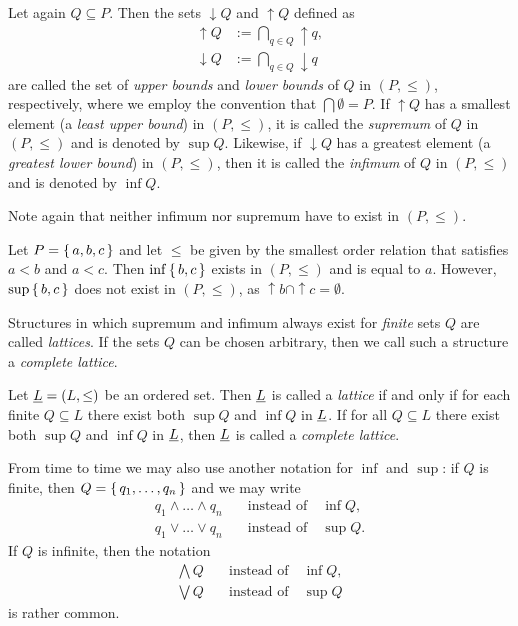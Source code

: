 Let again $Q \subseteq P$.  Then the sets ${\downarrow} Q$ and ${\uparrow} Q$ defined as
\begin{align*}
  {\uparrow} Q &:= \bigcap_{q \in Q} {\uparrow} q,\\
  {\downarrow} Q &:= \bigcap_{q \in Q} {\downarrow} q
\end{align*}
are called the set of \emph{upper bounds} and \emph{lower bounds} of $Q$ in $(P, \le)$,
respectively, where we employ the convention that $\bigcap \emptyset = P$.  If ${\uparrow}
Q$ has a smallest element (a \emph{least upper bound}) in $(P, \le)$, it is called the
\emph{supremum} of $Q$ in $(P, \le)$ and is denoted by $\sup Q$.  Likewise, if
${\downarrow} Q$ has a greatest element (a \emph{greatest lower bound}) in $(P, \le)$,
then it is called the \emph{infimum} of $Q$ in $(P, \le)$ and is denoted by $\inf Q$.

Note again that neither infimum nor supremum have to exist in $(P, \le)$.

\begin{Example}
  \label{expl:3}
  Let $P = {\{\, a, b, c \,\}}$ and let $\le$ be given by the smallest order relation that
  satisfies $a < b$ and $a < c$.  Then $\inf{\ensuremath{\{\,b,c\,\}}}$ exists in $(P, \le)$ and is equal
  to $a$.  However, $\sup{\ensuremath{\{\,b, c\,\}}}$ does not exist in $(P, \le)$, as ${\uparrow} b \cap
  {\uparrow} c = \emptyset$.
\end{Example}

\noindent%
Structures in which supremum and infimum always exist for \emph{finite} sets $Q$ are
called \emph{lattices}.  If the sets $Q$ can be chosen arbitrary, then we call such a
structure a \emph{complete lattice}.

\begin{Definition}[Lattice]
  \label{def:lattice}
  Let ${\underline{L}} = (L, \le)$ be an ordered set.  Then ${\underline{L}}$ is called a \emph{lattice} if
  and only if for each finite $Q \subseteq L$ there exist both $\sup Q$ and $\inf Q$ in
  ${\underline{L}}$.  If for all $Q \subseteq L$ there exist both $\sup Q$ and $\inf Q$ in ${\underline{L}}$, then ${\underline{L}}$ is called a \emph{complete lattice}.
\end{Definition}

\noindent%
From time to time we may also use another notation for $\inf$ and $\sup$: if $Q$ is
finite, then $Q = {\{\, q_1, \dots, q_n \,\}}$ and we may write
\begin{align*}
  q_1 \wedge \dots \wedge q_n &\quad\text{instead of}\quad \inf Q,\\
  q_1 \vee \dots \vee q_n &\quad\text{instead of}\quad \sup Q.
\end{align*}
If $Q$ is infinite, then the notation
\begin{align*}
  \bigwedge Q &\quad\text{instead of}\quad \inf Q,\\
  \bigvee Q &\quad\text{instead of}\quad \sup Q
\end{align*}
is rather common.

